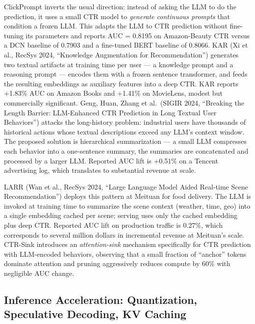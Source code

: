 \documentclass{article}
\begin{document}
ClickPrompt \citep{lin2023clickpromptctrmode} inverts the usual direction: instead of asking the LLM to do the prediction, it uses a small CTR model to \emph{generate continuous prompts} that condition a frozen LLM. This adapts the LLM to CTR prediction without fine-tuning its parameters and reports AUC = 0.8195 on Amazon-Beauty CTR versus a DCN baseline of 0.7903 and a fine-tuned BERT baseline of 0.8066. KAR (Xi et al., RecSys 2024, ``Knowledge Augmentation for Recommendation'') generates two textual artifacts at training time per user --- a knowledge prompt and a reasoning prompt --- encodes them with a frozen sentence transformer, and feeds the resulting embeddings as auxiliary features into a deep CTR. KAR reports +1.83\% AUC on Amazon Books and +1.41\% on MovieLens, modest but commercially significant. Geng, Huan, Zhang et al.~(SIGIR 2024, ``Breaking the Length Barrier: LLM-Enhanced CTR Prediction in Long Textual User Behaviors'') attacks the long-history problem: industrial users have thousands of historical actions whose textual descriptions exceed any LLM's context window. The proposed solution is hierarchical summarization --- a small LLM compresses each behavior into a one-sentence summary, the summaries are concatenated and processed by a larger LLM. Reported AUC lift is +0.51\% on a Tencent advertising log, which translates to substantial revenue at scale.

LARR (Wan et al., RecSys 2024, ``Large Language Model Aided Real-time Scene Recommendation'') deploys this pattern at Meituan for food delivery. The LLM is invoked at training time to summarize the scene context (weather, time, geo) into a single embedding cached per scene; serving uses only the cached embedding plus deep CTR. Reported AUC lift on production traffic is 0.27\%, which corresponds to several million dollars in incremental revenue at Meituan's scale. CTR-Sink \citep{li2025grefergraphretriev} introduces an \emph{attention-sink} mechanism specifically for CTR prediction with LLM-encoded behaviors, observing that a small fraction of ``anchor'' tokens dominate attention and pruning aggressively reduces compute by 60\% with negligible AUC change.

\subsection{Inference Acceleration: Quantization, Speculative Decoding, KV Caching}\label{inference-acceleration-quantization-speculative-decoding-kv-caching}
\end{document}
